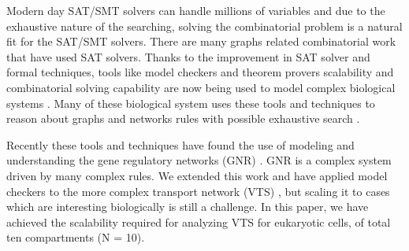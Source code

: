Modern day SAT/SMT solvers can handle millions of variables and due to the exhaustive nature of the searching, solving the combinatorial problem is a natural fit for the SAT/SMT solvers. There are many graphs related combinatorial work \cite{gay2013solving,wotzlaw2012generalized} that have used SAT solvers. Thanks to the improvement in SAT solver and formal techniques, tools like model checkers and theorem provers scalability and combinatorial solving capability are now being used to model complex biological systems \cite{heule2010exact,yordanov2013smt,mangla2010timing}.
Many of these biological system uses these tools and techniques to reason about graphs and networks rules with possible exhaustive search \cite{guerra2012reasoning,chin2008biographe}.  

Recently these tools and techniques have found the use of modeling and understanding the gene regulatory networks (GNR) \cite{giacobbe2015model,rosenblueth2014inference, batt2010efficient, yordanov2016method, dunn2014defining, paoletti2014analyzing, koksal2013synthesis}. GNR is a complex system driven by many complex rules. We extended this work and have applied model checkers to the more complex transport network (VTS) \cite{mani2016stacking,shukla}, but scaling it to cases which are interesting biologically is still a challenge. In this paper, we have achieved the scalability required for analyzing VTS for eukaryotic cells, of total ten compartments (N = 10). \\


